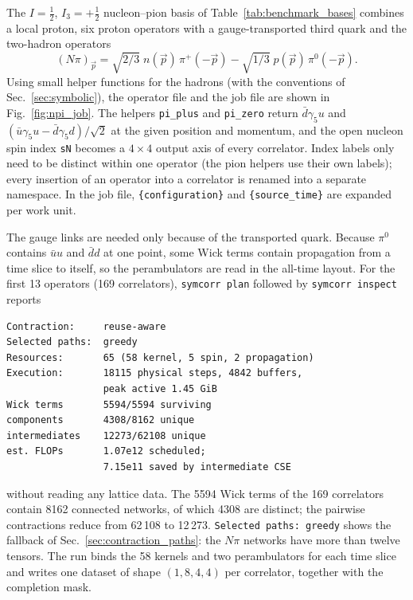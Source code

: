 \documentclass[a4paper,fleqn]{cas-dc}
\begin{document}
The \(I=\tfrac12\), \(I_3=+\tfrac12\) nucleon--pion basis of
Table~\ref{tab:benchmark_bases} combines a local proton, six proton operators with
a gauge-transported third quark and the two-hadron operators
\begin{equation}
(N\pi)_{\vec p} = \sqrt{2/3}\;n(\vec p)\,\pi^+(-\vec p)-\sqrt{1/3}\;p(\vec p)\,\pi^0(-\vec p).
\end{equation}
Using
small helper functions for the hadrons (with the conventions of
Sec.~\ref{sec:symbolic}), the operator file and the job file are shown in
Fig.~\ref{fig:npi_job}. The helpers \texttt{pi\_plus} and \texttt{pi\_zero} return
\(\bar d\gamma_5u\) and \((\bar u\gamma_5u-\bar d\gamma_5d)/\sqrt2\) at the given
position and momentum, and the open nucleon spin index \texttt{sN} becomes a
\(4\times4\) output axis of every correlator. Index labels only need to be distinct
within one operator (the pion helpers use their own labels); every insertion of
an operator into a correlator is renamed into a separate namespace. In the job
file, \texttt{\{configuration\}} and \texttt{\{source\_time\}} are expanded per work
unit.



The gauge links are needed only because of the transported quark. Because
\(\pi^0\) contains \(\bar uu\) and \(\bar dd\) at one point, some Wick terms
contain propagation from a time slice to itself, so the perambulators are read in
the all-time layout. For the first 13 operators (169 correlators),
\texttt{symcorr plan} followed by \texttt{symcorr inspect} reports
{\footnotesize
\begin{verbatim}
Contraction:     reuse-aware
Selected paths:  greedy
Resources:       65 (58 kernel, 5 spin, 2 propagation)
Execution:       18115 physical steps, 4842 buffers,
                 peak active 1.45 GiB
Wick terms       5594/5594 surviving
components       4308/8162 unique
intermediates    12273/62108 unique
est. FLOPs       1.07e12 scheduled;
                 7.15e11 saved by intermediate CSE
\end{verbatim}
}
without reading any lattice data. The 5594 Wick terms of the 169 correlators
contain 8162 connected networks, of which 4308 are distinct; the pairwise
contractions reduce from 62\,108 to 12\,273. \texttt{Selected paths: greedy}
shows the fallback of Sec.~\ref{sec:contraction_paths}: the \(N\pi\) networks
have more than twelve tensors. The run binds the 58 kernels and two
perambulators for each time slice and writes one dataset of shape
\((1, 8, 4, 4)\) per correlator, together with the completion mask.
\end{document}
